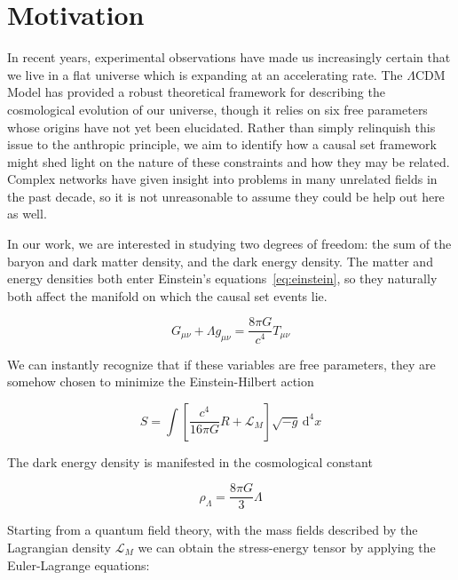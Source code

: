 \documentclass[preprint,notitlepage,amsmath,amssymb,floatfix]{revtex4-1}
\begin{document}
\section{Motivation}
In recent years, experimental observations have made us increasingly certain that we live in a flat universe which is expanding at an accelerating rate.  
The $\Lambda$CDM Model has provided a robust theoretical framework for describing the cosmological evolution of our universe, though it relies on six free parameters whose origins have not yet been elucidated.
Rather than simply relinquish this issue to the anthropic principle, we aim to identify how a causal set framework might shed light on the nature of these constraints and how they may be related.
Complex networks have given insight into problems in many unrelated fields in the past decade, so it is not unreasonable to assume they could be help out here as well. \par
In our work, we are interested in studying two degrees of freedom:  the sum of the baryon and dark matter density, and the dark energy density.  
The matter and energy densities both enter Einstein's equations~\eqref{eq:einstein}, so they naturally both affect the manifold on which the causal set events lie.

\begin{equation}
\label{eq:einstein}
G_{\mu\nu} + \Lambda g_{\mu\nu} = \frac{8\pi G}{c^4}T_{\mu\nu}
\end{equation}

\noindent We can instantly recognize that if these variables are free parameters, they are somehow chosen to minimize the Einstein-Hilbert action

\begin{equation}
\label{eq:EH_Action}
S = \int\!\left[\frac{c^4}{16\pi G}R+\mathcal{L}_M\right]\sqrt{-g}\, \mathrm d^4x
\end{equation}

\noindent The dark energy density is manifested in the cosmological constant

\begin{equation}
\label{eq:dark_energy_density}
\rho_\Lambda = \frac{8\pi G}{3}\Lambda
\end{equation}

\noindent Starting from a quantum field theory, with the mass fields described by the Lagrangian density $\mathcal{L}_M$ we can obtain the stress-energy tensor by applying the Euler-Lagrange equations:
\end{document}
